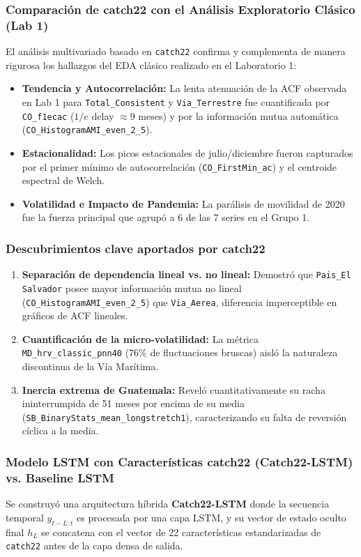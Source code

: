 \documentclass[11pt, a4paper]{article}
\begin{document}
\subsubsection{Comparación de catch22 con el Análisis Exploratorio Clásico (Lab 1)}
El análisis multivariado basado en \texttt{catch22} confirma y complementa de manera rigurosa los hallazgos del EDA clásico realizado en el Laboratorio 1:
\begin{itemize}
    \item \textbf{Tendencia y Autocorrelación:} La lenta atenuación de la ACF observada en Lab 1 para \texttt{Total\_Consistent} y \texttt{Via\_Terrestre} fue cuantificada por \texttt{CO\_f1ecac} ($1/e$ delay $\approx 9$ meses) y por la información mutua automática (\texttt{CO\_HistogramAMI\_even\_2\_5}).
    \item \textbf{Estacionalidad:} Los picos estacionales de julio/diciembre fueron capturados por el primer mínimo de autocorrelación (\texttt{CO\_FirstMin\_ac}) y el centroide espectral de Welch.
    \item \textbf{Volatilidad e Impacto de Pandemia:} La parálisis de movilidad de 2020 fue la fuerza principal que agrupó a 6 de las 7 series en el Grupo 1.
\end{itemize}

\subsubsection{Descubrimientos clave aportados por catch22}
\begin{enumerate}
    \item \textbf{Separación de dependencia lineal vs. no lineal:} Demostró que \texttt{Pais\_El Salvador} posee mayor información mutua no lineal (\texttt{CO\_HistogramAMI\_even\_2\_5}) que \texttt{Via\_Aerea}, diferencia imperceptible en gráficos de ACF lineales.
    \item \textbf{Cuantificación de la micro-volatilidad:} La métrica \texttt{MD\_hrv\_classic\_pnn40} (76\% de fluctuaciones bruscas) aisló la naturaleza discontinua de la Vía Marítima.
    \item \textbf{Inercia extrema de Guatemala:} Reveló cuantitativamente su racha ininterrumpida de 51 meses por encima de su media (\texttt{SB\_BinaryStats\_mean\_longstretch1}), caracterizando su falta de reversión cíclica a la media.
\end{enumerate}

\subsubsection{Modelo LSTM con Características catch22 (Catch22-LSTM) vs. Baseline LSTM}
Se construyó una arquitectura híbrida \textbf{Catch22-LSTM} donde la secuencia temporal $y_{t-L:t}$ es procesada por una capa LSTM, y su vector de estado oculto final $h_L$ se concatena con el vector de 22 características estandarizadas de \texttt{catch22} antes de la capa densa de salida.
\end{document}
